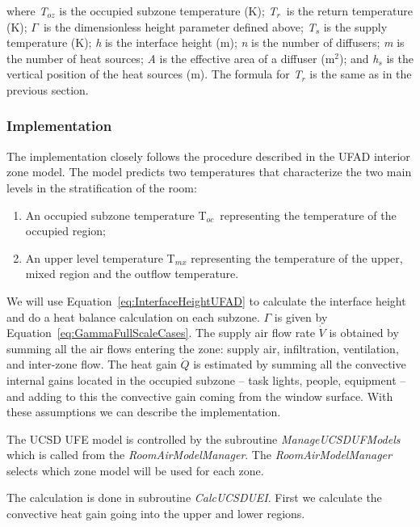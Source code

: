 {where \emph{T\(_{oz}\)} is the occupied subzone temperature (K); \emph{T\(_{r}\)}~is the return temperature (K); \emph{\(\Gamma\)}~is the dimensionless height parameter defined above; \emph{T\(_{s}\)} is the supply temperature (K); \emph{h} is the interface height (m); \emph{n} is the number of diffusers; \emph{m} is the number of heat sources; \emph{A} is the effective area of a diffuser (m\(^{2}\)); and \emph{h\(_{s}\)} is the vertical position of the heat sources (m). The formula for \emph{T\(_{r}\)} is the same as in the previous section.

\subsubsection{Implementation}\label{implementation-2}

The implementation closely follows the procedure described in the UFAD interior zone model. The model predicts two temperatures that characterize the two main levels in the stratification of the room:

\begin{enumerate}
\item An occupied subzone temperature T\(_{oc}\)~representing the temperature of the occupied region;
\item An upper level temperature T\(_{mx}\) representing the temperature of the upper, mixed region and the outflow temperature.
\end{enumerate}

We will use Equation~\ref{eq:InterfaceHeightUFAD} to calculate the interface height and do a heat balance calculation on each subzone. \emph{\(\Gamma\)} is given by Equation~\ref{eq:GammaFullScaleCases}. The supply air flow rate \(\dot V\) is obtained by summing all the air flows entering the zone: supply air, infiltration, ventilation, and inter-zone flow. The heat gain \(\dot Q\) is estimated by summing all the convective internal gains located in the occupied subzone -- task lights, people, equipment -- and adding to this the convective gain coming from the window surface. With these assumptions we can describe the implementation.

The UCSD UFE model is controlled by the subroutine \emph{ManageUCSDUFModels} which is called from the \emph{RoomAirModelManager}. The \emph{RoomAirModelManager} selects which zone model will be used for each zone.

The calculation is done in subroutine \emph{CalcUCSDUEI}. First we calculate the convective heat gain going into the upper and lower regions.

}
